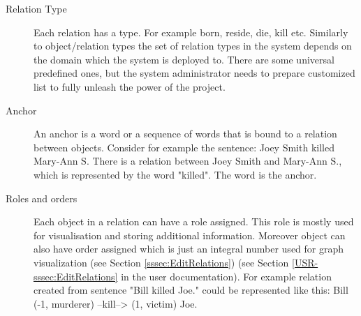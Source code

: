 \begin{description}
\item[Relation Type]
Each relation has a type. For example born, reside, die, kill etc. Similarly to
object/relation types the set of relation types in the system depends on the
domain which the system is deployed to. There are some universal predefined ones, but the system administrator needs to prepare customized list to fully unleash the power of the project.

\item[Anchor]
An anchor is a word or a sequence of words that is bound to a relation between
objects. Consider for example the sentence: Joey Smith killed Mary-Ann S. There
is a relation between Joey Smith and Mary-Ann S., which is represented by the
word "killed". The word is the anchor. 

\item[Roles and orders]
Each object in a relation can have a role assigned. This role is mostly used
for visualisation and storing additional information. Moreover object can also
have order assigned which is just an integral number used for graph
visualization\ifdefined\USRDOC{} (see Section \ref{sssec:EditRelations})\fi{}
\ifdefined\DEVDOC{} (see Section \ref{USR-sssec:EditRelations} in the user
documentation)\fi{}. For example relation created from sentence
"Bill killed Joe." could be represented like this:
Bill (-1, murderer) --kill--> (1, victim) Joe.
\end{description}

